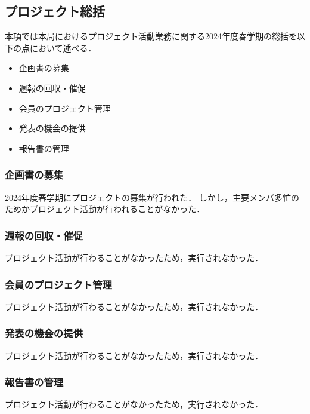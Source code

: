 
\subsection*{プロジェクト総括}


本項では本局におけるプロジェクト活動業務に関する2024年度春学期の総括を以下の点において述べる．

\begin{itemize}
  \item 企画書の募集
  \item 週報の回収・催促
  \item 会員のプロジェクト管理
  \item 発表の機会の提供
  \item 報告書の管理
\end{itemize}

\subsubsection*{企画書の募集}

2024年度春学期にプロジェクトの募集が行われた．
しかし，主要メンバ多忙のためかプロジェクト活動が行われることがなかった．

\subsubsection*{週報の回収・催促}

プロジェクト活動が行わることがなかったため，実行されなかった．

\subsubsection*{会員のプロジェクト管理}

プロジェクト活動が行わることがなかったため，実行されなかった．

\subsubsection*{発表の機会の提供}

プロジェクト活動が行わることがなかったため，実行されなかった．

\subsubsection*{報告書の管理}

プロジェクト活動が行わることがなかったため，実行されなかった．
